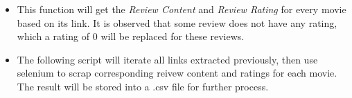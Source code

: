 \documentclass[]{article}
\newenvironment{Shaded}{\begin{snugshade}}{\end{snugshade}}
\newcommand{\KeywordTok}[1]{\textcolor[rgb]{0.13,0.29,0.53}{\textbf{#1}}}
\newcommand{\DataTypeTok}[1]{\textcolor[rgb]{0.13,0.29,0.53}{#1}}
\newcommand{\DecValTok}[1]{\textcolor[rgb]{0.00,0.00,0.81}{#1}}
\newcommand{\StringTok}[1]{\textcolor[rgb]{0.31,0.60,0.02}{#1}}
\newcommand{\OtherTok}[1]{\textcolor[rgb]{0.56,0.35,0.01}{#1}}
\newcommand{\ControlFlowTok}[1]{\textcolor[rgb]{0.13,0.29,0.53}{\textbf{#1}}}
\newcommand{\OperatorTok}[1]{\textcolor[rgb]{0.81,0.36,0.00}{\textbf{#1}}}
\newcommand{\NormalTok}[1]{#1}
\providecommand{\tightlist}{%
  \setlength{\itemsep}{0pt}\setlength{\parskip}{0pt}}
\begin{document}
\begin{itemize}
\tightlist
\item
  This function will get the \emph{Review Content} and \emph{Review
  Rating} for every movie based on its link. It is observed that some
  review does not have any rating, which a rating of 0 will be replaced
  for these reviews.
\end{itemize}

\begin{Shaded}
\end{Shaded}

\begin{itemize}
\tightlist
\item
  The following script will iterate all links extracted previously, then
  use selenium to scrap corresponding reivew content and ratings for
  each movie. The result will be stored into a .csv file for further
  process.
\end{itemize}
\end{document}
